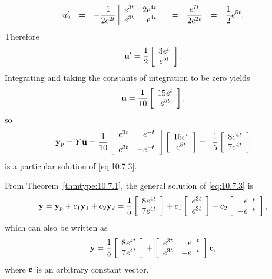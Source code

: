 \begin{examplesolution}
\[\begin{array}{ccccccl}
    u_{2}' & = & -\displaystyle\frac{1}{2e^{2t}} \left|\begin{array}{rr}e^{3t}&2e^{4t}\\e^{3t}&e^{4t}\end{array}\right|  & = & \displaystyle\frac{e^{7t}}{2e^{2t}}  & = & \displaystyle\frac{1}{2}e^{5t}.
  \end{array}
\]
Therefore
\[
  {\bf u}'=\frac{1}{2}\left[
  \begin{array}{c}
    3e^{t} \\
    e^{5t}
  \end{array}\right].
\]
Integrating and taking the constants of integration to be zero yields
\[
  {\bf u}=\frac{1}{10}\left[
  \begin{array}{c}
    15e^{t} \\
    e^{5t}
  \end{array}\right],
\]
so
\[
  {\bf y}_{p}=Y{\bf u}= \displaystyle\frac{1}{10}\left[
  \begin{array}{rr}
    e^{3t} & e^{-t}  \\[2\jot]
    e^{3t} & -e^{-t}
  \end{array}\right] \left[
  \begin{array}{c}
    15e^{t} \\
    e^{5t}
  \end{array}\right] =\phantom{0}\displaystyle\frac{1}{5}\left[
  \begin{array}{c}
    8e^{4t} \\
    7e^{4t}
  \end{array}\right]
\]
is a particular solution of \eqref{eq:10.7.3}.

 From Theorem~\ref{thmtype:10.7.1}, the general solution of \eqref{eq:10.7.3} is
\begin{equation}
  \label{eq:10.7.5}{\bf y}={\bf y}_{p}+c_{1}{\bf y}_{1}+c_{2}{\bf y}_{2}= \frac{1}{5}\left[
  \begin{array}{c}
    8e^{4t} \\
    7e^{4t}
  \end{array}\right] +c_{1}\left[
  \begin{array}{r}
    e^{3t} \\
    e^{3t}
  \end{array}\right] +c_{2}\left[
  \begin{array}{r}
    e^{-t}  \\
    -e^{-t}
  \end{array}\right],
\end{equation}
which can also be written as
\[
  {\bf y}= \frac{1}{5}\left[
  \begin{array}{c}
    8e^{4t} \\
    7e^{4t}
  \end{array}\right] +\left[
  \begin{array}{rr}
    e^{3t} & e^{-t}  \\
    e^{3t} & -e^{-t}
  \end{array}\right]{\bf c},
\]
where ${\bf c}$ is an arbitrary constant vector.


\end{examplesolution}
